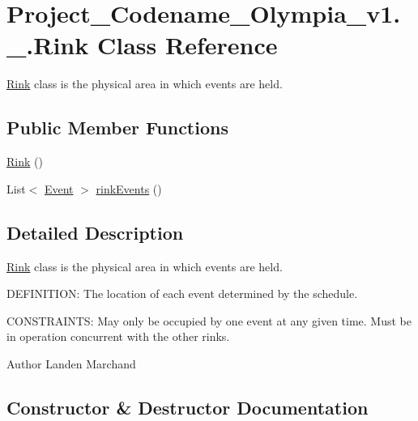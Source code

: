 \hypertarget{classProject__Codename__Olympia__v1_1_1__0_1_1Rink}{}\section{Project\+\_\+\+Codename\+\_\+\+Olympia\+\_\+v1.\+\_.\+Rink Class Reference}
\label{classProject__Codename__Olympia__v1_1_1__0_1_1Rink}


\hyperlink{classProject__Codename__Olympia__v1_1_1__0_1_1Rink}{Rink} class is the physical area in which events are held.  


\subsection*{Public Member Functions}
\begin{DoxyCompactItemize}
\item 
\hyperlink{classProject__Codename__Olympia__v1_1_1__0_1_1Rink_a25a7e3b332da40b6ff448203f1006063}{Rink} ()
\item 
List$<$ \hyperlink{classProject__Codename__Olympia__v1_1_1__0_1_1Event}{Event} $>$ \hyperlink{classProject__Codename__Olympia__v1_1_1__0_1_1Rink_a79363adae7214d4718bd0e6c6dde7258}{rink\+Events} ()
\end{DoxyCompactItemize}


\subsection{Detailed Description}
\hyperlink{classProject__Codename__Olympia__v1_1_1__0_1_1Rink}{Rink} class is the physical area in which events are held. 

D\+E\+F\+I\+N\+I\+T\+I\+ON\+: The location of each event determined by the schedule.

C\+O\+N\+S\+T\+R\+A\+I\+N\+TS\+: May only be occupied by one event at any given time. Must be in operation concurrent with the other rinks.\begin{DoxyAuthor}{Author}
Landen Marchand 
\end{DoxyAuthor}


\subsection{Constructor \& Destructor Documentation}
\mbox{\label{classProject__Codename__Olympia__v1_1_1__0_1_1Rink_a25a7e3b332da40b6ff448203f1006063}} 
